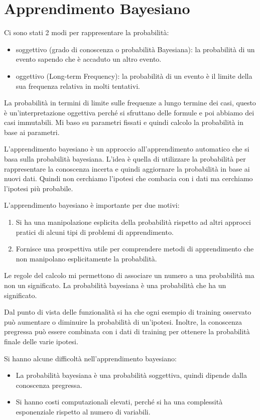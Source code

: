 \chapter{Apprendimento Bayesiano}
Ci sono stati 2 modi per rappresentare la probabilità:
\begin{itemize}
    \item soggettivo (grado di conoscenza o probabilità Bayesiana): la probabilità
          di un evento sapendo che è accaduto un altro evento.
    \item oggettivo (Long-term Frequency): la probabilità di un evento è il limite
          della sua frequenza relativa in molti tentativi.
\end{itemize}
La probabilità in termini di limite sulle frequenze a lungo termine dei casi,
questo è un'interpretazione oggettiva perché si sfruttano delle formule e poi
abbiamo dei casi immutabili. Mi baso su parametri fissati e quindi calcolo la
probabilità in base ai parametri.

L'apprendimento bayesiano è un approccio all'apprendimento automatico che si basa
sulla probabilità bayesiana. L'idea è quella di utilizzare la probabilità per
rappresentare la conoscenza incerta e quindi aggiornare la probabilità in base
ai nuovi dati. Quindi non cerchiamo l'ipotesi che combacia con i dati ma cerchiamo
l'ipotesi più probabile.

L'apprendimento bayesiano è importante per due motivi:
\begin{enumerate}
    \item Si ha una manipolazione esplicita della probabilità rispetto ad altri
          approcci pratici di alcuni tipi di problemi di apprendimento.
    \item Fornisce una prospettiva utile per comprendere metodi di apprendimento
          che non manipolano esplicitamente la probabilità.
\end{enumerate}

Le regole del calcolo mi permettono di associare un numero a una probabilità ma
non un significato. La probabilità bayesiana è una probabilità che ha un significato.

Dal punto di vista delle funzionalità si ha che ogni esempio di training osservato
può aumentare o diminuire la probabilità di un'ipotesi. Inoltre, la conoscenza
pregressa può essere combinata con i dati di training per ottenere la probabilità
finale delle varie ipotesi.

Si hanno alcune difficoltà nell'apprendimento bayesiano:
\begin{itemize}
    \item La probabilità bayesiana è una probabilità soggettiva, quindi dipende
          dalla conoscenza pregressa.
    \item Si hanno costi computazionali elevati, perché si ha una complessità
          esponenziale rispetto al numero di variabili.
\end{itemize}


